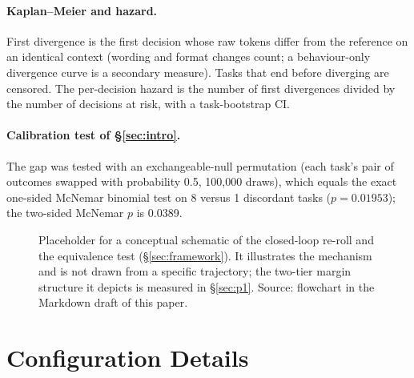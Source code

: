 \paragraph{Kaplan--Meier and hazard.} First divergence is the first decision whose raw tokens differ from the reference on an identical context (wording and format changes count; a behaviour-only divergence curve is a secondary measure). Tasks that end before diverging are censored. The per-decision hazard is the number of first divergences divided by the number of decisions at risk, with a task-bootstrap CI.

\paragraph{Calibration test of \S\ref{sec:intro}.} The gap was tested with an exchangeable-null permutation (each task's pair of outcomes swapped with probability 0.5, 100,000 draws), which equals the exact one-sided McNemar binomial test on 8 versus 1 discordant tasks ($p = 0.01953$); the two-sided McNemar $p$ is 0.0389.

\begin{figure}[h]
\centering
{}
\caption{Placeholder for a conceptual schematic of the closed-loop re-roll and the equivalence test (\S\ref{sec:framework}). It illustrates the mechanism and is not drawn from a specific trajectory; the two-tier margin structure it depicts is measured in \S\ref{sec:p1}. Source: flowchart in the Markdown draft of this paper.}
\label{fig:schematic}
\end{figure}

\section{Configuration Details}
\label{app:config}

